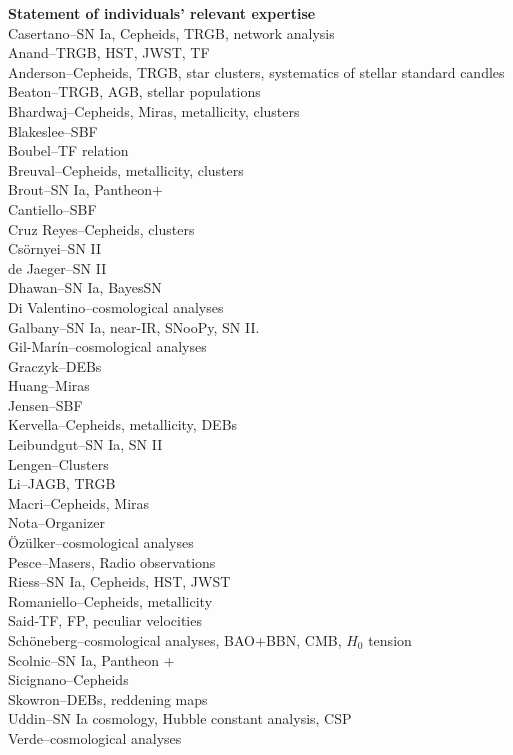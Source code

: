 \begin{acknowledgements}
\end{acknowledgements}

\textbf{Statement of individuals' relevant expertise}\\
\label{expertise}
\noindent Casertano--SN Ia, Cepheids, TRGB, network analysis \\
Anand--TRGB, HST, JWST, TF \\
Anderson--Cepheids, TRGB, star clusters, systematics of stellar standard candles \\
Beaton--TRGB, AGB, stellar populations \\
Bhardwaj--Cepheids, Miras, metallicity, clusters\\
Blakeslee--SBF\\
Boubel--TF relation \\
Breuval--Cepheids, metallicity, clusters\\
Brout--SN Ia, Pantheon$+$\\
Cantiello--SBF\\
Cruz Reyes--Cepheids, clusters\\
Cs\"ornyei--SN II\\
de Jaeger--SN II\\
Dhawan--SN Ia, BayesSN\\
Di Valentino--cosmological analyses\\
Galbany--SN Ia, near-IR, SNooPy, SN II.\\
Gil-Mar\'in--cosmological analyses\\
Graczyk--DEBs\\
Huang--Miras\\
Jensen--SBF\\
Kervella--Cepheids, metallicity, DEBs\\
Leibundgut--SN Ia, SN II\\
Lengen--Clusters\\
Li--JAGB, TRGB\\
Macri--Cepheids, Miras\\
Nota--Organizer\\
\"{O}z\"{u}lker--cosmological analyses\\
Pesce--Masers, Radio observations\\
Riess--SN Ia, Cepheids, HST, JWST\\
Romaniello--Cepheids, metallicity\\
Said-TF, FP, peculiar velocities\\
Sch\"oneberg--cosmological analyses, BAO+BBN, CMB, $H_0$ tension\\
Scolnic--SN Ia, Pantheon $+$\\
Sicignano--Cepheids\\
Skowron--DEBs, reddening maps\\
Uddin--SN Ia cosmology, Hubble constant analysis, CSP\\
Verde--cosmological analyses\\

